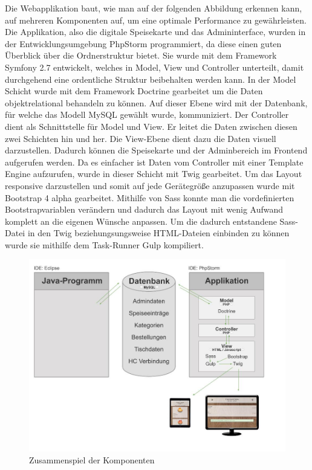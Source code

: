 Die Webapplikation baut, wie man auf der folgenden Abbildung erkennen kann, auf mehreren Komponenten auf, um eine optimale Performance zu gewährleisten. 
Die Applikation, also die digitale Speisekarte und das Admininterface, wurden in der Entwicklungsumgebung PhpStorm programmiert, da diese einen guten Überblick über die Ordnerstruktur bietet.
Sie wurde mit dem Framework Symfony 2.7 entwickelt, welches in Model, View und Controller unterteilt, damit durchgehend eine ordentliche Struktur beibehalten werden kann. In der Model Schicht wurde mit dem Framework Doctrine gearbeitet um die Daten objektrelational behandeln zu können. Auf dieser Ebene wird mit der Datenbank, für welche das Modell MySQL gewählt wurde, kommuniziert.
Der Controller dient als Schnittstelle für Model und View. Er leitet die Daten zwischen diesen zwei Schichten hin und her. 
Die View-Ebene dient dazu die Daten visuell darzustellen. Dadurch können die Speisekarte und der Adminbereich im Frontend aufgerufen werden. Da es einfacher ist Daten vom Controller mit einer Template Engine aufzurufen, wurde in dieser Schicht mit Twig gearbeitet. Um das Layout responsive darzustellen und somit auf jede Gerätegröße anzupassen wurde mit Bootstrap 4 alpha gearbeitet. Mithilfe von Sass konnte man die vordefinierten Bootstrapvariablen verändern und dadurch das Layout mit wenig Aufwand komplett an die eigenen Wünsche anpassen. 
Um die dadurch entstandene Sass-Datei in den Twig beziehungsungsweise HTML-Dateien einbinden zu können wurde sie mithilfe dem Task-Runner Gulp kompiliert.\\ 
			\begin{figure}[H]
			\begin{centering}
			\includegraphics[width = 1\textwidth]{Bilder/Jok_zusammenspiel_applikation.jpg}
			\par\end{centering}
			\caption{Zusammenspiel der Komponenten}
			\label{Zusammenspiel der Komponenten}
			\end{figure}
			
